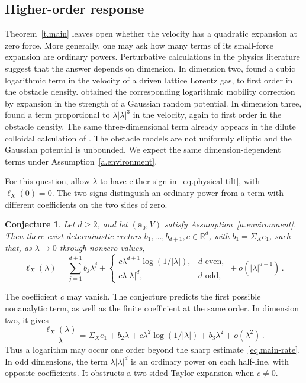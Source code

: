 \documentclass[11pt]{amsart}
\newtheorem{conjecture}[proposition]{Conjecture}
\theoremstyle{definition}
\theoremstyle{remark}
\numberwithin{equation}{section}
\newcommand{\R}{\mathbb R}
\renewcommand{\a}{\mathbf a}
\begin{document}
\subsection{Higher-order response}\label{ss.intro-sharpness}

Theorem~\ref{t.main} leaves open whether the velocity has a quadratic expansion at zero force. More generally, one may ask how many terms of its small-force expansion are ordinary powers. Perturbative calculations in the physics literature suggest that the answer depends on dimension. In dimension two, \citet*{LeitmannFranosch2013} found a cubic logarithmic term in the velocity of a driven lattice Lorentz gas, to first order in the obstacle density. \citet{Novikov2018} obtained the corresponding logarithmic mobility correction by expansion in the strength of a Gaussian random potential. In dimension three, \citet*{LeitmannBenichouFranosch2018} found a term proportional to $\lambda|\lambda|^3$ in the velocity, again to first order in the obstacle density. The same three-dimensional term already appears in the dilute colloidal calculation of \citet*{SquiresBrady2005}. The obstacle models are not uniformly elliptic and the Gaussian potential is unbounded. We expect the same dimension-dependent terms under Assumption~\ref{a.environment}.

For this question, allow $\lambda$ to have either sign in~\eqref{eq.physical-tilt}, with $\ell_X(0)=0$. The two signs distinguish an ordinary power from a term with different coefficients on the two sides of zero.

\begin{conjecture}\label{conj.expansion}
Let $d\geq2$, and let $(\a_0,V)$ satisfy Assumption~\ref{a.environment}. Then there exist deterministic vectors $b_1,\ldots,b_{d+1},c\in\R^d$, with $b_1=\Sigma_Xe_1$, such that, as $\lambda\to0$ through nonzero values,
\begin{equation}\label{eq.conjectured-expansion}
 \ell_X(\lambda)
 =\sum_{j=1}^{d+1}b_j\lambda^j
 +\begin{cases}
 c\lambda^{d+1}\log(1/|\lambda|),&d\text{ even},\\
 c\lambda|\lambda|^d,&d\text{ odd},
 \end{cases}
 +o(|\lambda|^{d+1})\, .
\end{equation}
\end{conjecture}

The coefficient $c$ may vanish. The conjecture predicts the first possible nonanalytic term, as well as the finite coefficient at the same order. In dimension two, it gives
\begin{equation*}
 \frac{\ell_X(\lambda)}\lambda
 =\Sigma_Xe_1+b_2\lambda+c\lambda^2\log(1/|\lambda|)
 +b_3\lambda^2+o(\lambda^2)\, .
\end{equation*}
Thus a logarithm may occur one order beyond the sharp estimate~\eqref{eq.main-rate}. In odd dimensions, the term $\lambda|\lambda|^d$ is an ordinary power on each half-line, with opposite coefficients. It obstructs a two-sided Taylor expansion when $c\neq0$.
\end{document}
